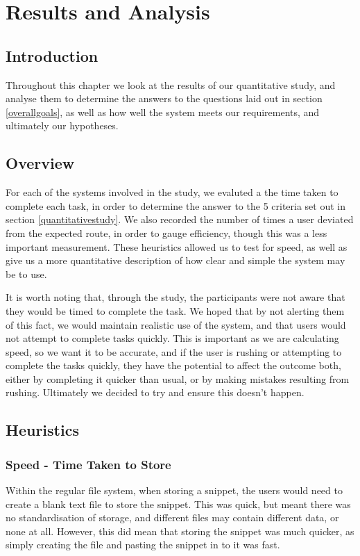 \chapter{Results and Analysis}

\section{Introduction}
Throughout this chapter we look at the results of our quantitative study, and analyse them to determine the answers to the questions laid out in section \ref{overallgoals}, as well as how well the system meets our requirements, and ultimately our hypotheses. 

\section{Overview}
For each of the systems involved in the study, we evaluted a the time taken to complete each task, in order to determine the answer to the 5 criteria set out in section \ref{quantitativestudy}.
We also recorded the number of times a user deviated from the expected route, in order to gauge efficiency, though this was a less important measurement.
These heuristics allowed us to test for speed, as well as give us a more quantitative description of how clear and simple the system may be to use.

It is worth noting that, through the study, the participants were not aware that they would be timed to complete the task.
We hoped that by not alerting them of this fact, we would maintain realistic use of the system, and that users would not attempt to complete tasks quickly.
This is important as we are calculating speed, so we want it to be accurate, and if the user is rushing or attempting to complete the tasks quickly, they have the potential to affect the outcome both, either by completing it quicker than usual, or by making mistakes resulting from rushing.
Ultimately we decided to try and ensure this doesn't happen.

\section{Heuristics}

\subsection{Speed - Time Taken to Store}
Within the regular file system, when storing a snippet, the users would need to create a blank text file to store the snippet. This was quick, but meant there was no standardisation of storage, and different files may contain different data, or none at all. 
However, this did mean that storing the snippet was much quicker, as simply creating the file and pasting the snippet in to it was fast.

